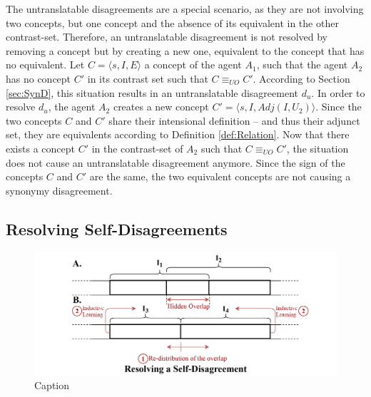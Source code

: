 The untranslatable disagreements are a special scenario, as they are not involving two concepts, but one concept and the absence of its equivalent in the other contrast-set. Therefore, an untranslatable disagreement is not resolved by removing a concept but by creating a new one, equivalent to the concept that has no equivalent.
Let $C = \langle s, I, E \rangle$ a concept of the agent $A_{1}$, such that the agent $A_{2}$ has no concept $C'$ in its contrast set such that $C \equiv_{UO} C'$. According to Section \ref{sec:SynD}, this situation results in an untranslatable disagreement $d_{u}$.
In order to resolve $d_{u}$, the agent $A_{2}$ creates a new concept $C' = \langle s, I, Adj(I,U_{2}) \rangle$. Since the two concepts $C$ and $C'$ share their intensional definition -- and thus their adjunct set, they are equivalents according to Definition \ref{def:Relation}.
Now that there exists a concept $C'$ in the contrast-set of $A_{2}$ such that $C \equiv_{UO} C'$, the situation does not cause an untranslatable disagreement anymore.
Since the sign of the concepts $C$ and $C'$ are the same, the two equivalent concepts are not causing a synonymy disagreement.

\subsection{Resolving Self-Disagreements}

\begin{figure}[t]
    \centering
    \includegraphics[width=\textwidth]{figs/SelfDisagreement.pdf}
    \caption{Caption}
    \label{fig:SolveSelf}
\end{figure}


